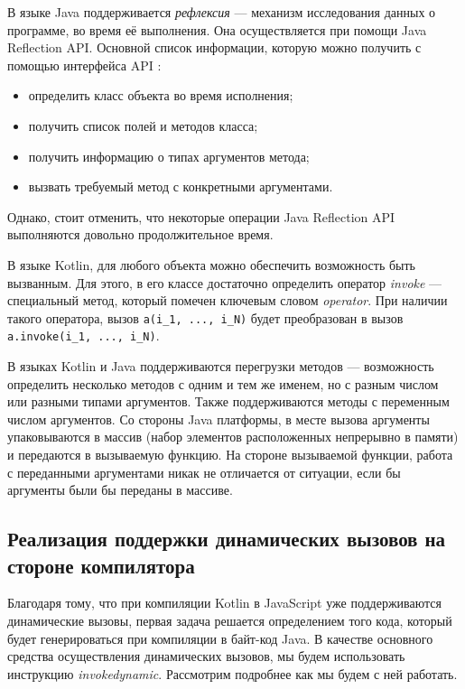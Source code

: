 В языке Java поддерживается \textit{рефлексия} --- механизм исследования данных о программе, во время её выполнения. Она осуществляется при помощи Java Reflection API. Основной список информации, которую можно получить с помощью интерфейса API \cite{java:forman2004javaReflectionsInAction}:

\begin{itemize}
    \item определить класс объекта во время исполнения;
    \item получить список полей и методов класса;
    \item получить информацию о типах аргументов метода;
    \item вызвать требуемый метод с конкретными аргументами.
\end{itemize}

Однако, стоит отменить, что некоторые операции Java Reflection API выполняются довольно продолжительное время.


В языке Kotlin, для любого объекта можно обеспечить возможность быть вызванным. Для этого, в его классе достаточно определить оператор \textit{invoke} --- специальный метод, который помечен ключевым словом \textit{operator}. При наличии такого оператора, вызов \texttt{a(i_1, ..., i_N)} будет преобразован в вызов \texttt{a.invoke(i_1, ..., i_N)}.

В языках Kotlin и Java поддерживаются перегрузки методов --- возможность определить несколько методов с одним и тем же именем, но с разным числом или разными типами аргументов. Также поддерживаются методы с переменным числом аргументов. Со стороны Java платформы, в месте вызова аргументы упаковываются в массив (набор элементов расположенных непрерывно в памяти) и передаются в вызываемую функцию. На стороне вызываемой функции, работа с переданными аргументами никак не отличается от ситуации, если бы аргументы были бы переданы в массиве.








\subsection{Реализация поддержки динамических вызовов на стороне компилятора}
\label{sec:compileRealization}

Благодаря тому, что при компиляции Kotlin в JavaScript уже поддерживаются динамические вызовы, первая задача решается определением того кода, который будет генерироваться при компиляции в байт-код Java. В качестве основного средства осуществления динамических вызовов, мы будем использовать инструкцию \textit{invokedynamic}. Рассмотрим подробнее как мы будем с ней работать.

